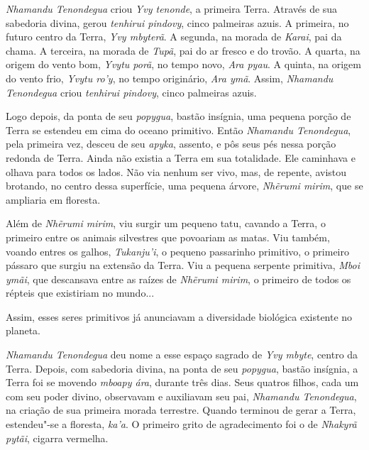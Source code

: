 

 

 



\emph{Nhamandu Tenondegua} criou \emph{Yvy tenonde}, a primeira Terra.
Através de sua sabedoria divina, gerou \emph{tenhirui pindovy}, cinco
palmeiras azuis. A primeira, no futuro centro da Terra, \emph{Yvy
mbyterã}. A segunda, na morada de \emph{Karai}, pai da chama. A terceira, na morada de \emph{Tupã}, pai do ar fresco e do trovão. A quarta, na origem do vento bom, \emph{Yvytu porã}, no tempo novo,
\emph{Ara pyau}. A quinta, na origem do vento frio, \emph{Yvytu ro'y},
no tempo originário, \emph{Ara ymã}. Assim, \emph{Nhamandu Tenondegua}
criou \emph{tenhirui pindovy}, cinco palmeiras azuis{.}

Logo depois, da ponta de seu \emph{popygua}, bastão insígnia, uma
pequena porção de Terra se estendeu em cima do oceano primitivo. Então
\emph{Nhamandu Tenondegua}, pela primeira vez, desceu de seu
\emph{apyka}, assento, e pôs seus pés nessa porção redonda de Terra.
Ainda não existia a Terra em sua totalidade. Ele caminhava e olhava para
todos os lados. Não via nenhum ser vivo, mas, de repente, avistou
brotando, no centro dessa superfície, uma pequena árvore, \emph{Nhẽrumi
mirim}, que se ampliaria em floresta.


\clearpage	


Além de \emph{Nhẽrumi mirim}, viu surgir um pequeno tatu, cavando a
Terra, o primeiro entre os animais silvestres que povoariam as matas.
Viu também, voando entres os galhos, \emph{Tukanju'i}, o pequeno
passarinho primitivo, o primeiro pássaro que surgiu na extensão da
Terra. Viu a pequena serpente primitiva, \emph{Mboi ymãi}, que
descansava entre as raízes de \emph{Nhẽrumi mirim}, o primeiro de todos
os répteis que existiriam no mundo... 

 

Assim, esses seres primitivos já anunciavam a diversidade biológica
existente no planeta.



\emph{Nhamandu Tenondegua} deu nome a esse espaço sagrado de \emph{Yvy
mbyte}, centro da Terra. Depois, com sabedoria divina, na ponta de seu
\emph{popygua}, bastão insígnia, a Terra foi se movendo \emph{mboapy
ára}, durante três dias. Seus quatros filhos, cada um com seu poder
divino, observavam e auxiliavam seu pai, \emph{Nhamandu Tenondegua}, na
criação de sua primeira morada terrestre. Quando terminou de gerar a
Terra, estendeu"-se a floresta, \emph{ka'a}. O primeiro grito de
agradecimento foi o de \emph{Nhakyrã pytãi}, cigarra vermelha.

